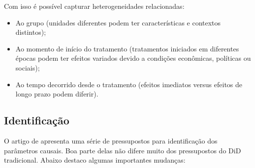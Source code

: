 \documentclass[
	12pt,				%
	openright,			%
	oneside,			%
	a4paper,			%
	english,			%
	french,				%
	spanish,			%
	brazil				%
	]{abntex2}
\begin{document}
Com isso é possível capturar heterogeneidades relacionadas:
\begin{itemize}
\item Ao grupo (unidades diferentes podem ter características e contextos distintos);
\item Ao momento de início do tratamento (tratamentos iniciados em diferentes épocas podem ter efeitos variados devido a condições econômicas, políticas ou sociais);
\item Ao tempo decorrido desde o tratamento (efeitos imediatos versus efeitos de longo prazo podem diferir).
\end{itemize}

\subsection{Identificação}

O artigo de  apresenta uma série de pressupostos para identificação dos parâmetros causais. Boa parte delas não difere muito dos pressupostos do DiD tradicional. Abaixo destaco algumas importantes mudanças:
\end{document}
